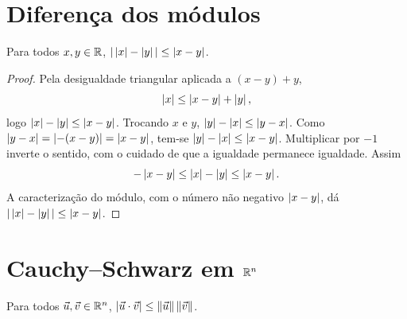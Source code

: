 \documentclass[11pt,a4paper]{article}
\begin{document}
\section{Diferença dos módulos}

\begin{corolario}
Para todos $x,y\in\R$, $\abs{\,\abs{x}-\abs{y}\,}\le\abs{x-y}$.
\end{corolario}

\begin{proof}
Pela desigualdade triangular aplicada a $(x-y)+y$,
\[
\abs{x}\le\abs{x-y}+\abs{y},
\]
logo $\abs{x}-\abs{y}\le\abs{x-y}$. Trocando $x$ e $y$, $\abs{y}-\abs{x}\le\abs{y-x}$. Como $\abs{y-x}=\abs{-(x-y)}=\abs{x-y}$, tem-se $\abs{y}-\abs{x}\le\abs{x-y}$. Multiplicar por $-1$ inverte o sentido, com o cuidado de que a igualdade permanece igualdade. Assim
\[
-\abs{x-y}\le\abs{x}-\abs{y}\le\abs{x-y}.
\]
A caracterização do módulo, com o número não negativo $\abs{x-y}$, dá $\abs{\,\abs{x}-\abs{y}\,}\le\abs{x-y}$.
\end{proof}

\section{Cauchy--Schwarz em \texorpdfstring{$\R^n$}{Rn}}

\begin{teorema}
Para todos $\vet{u},\vet{v}\in\R^n$, $\abs{\vet{u}\cdot\vet{v}}\le\norm{\vet{u}}\norm{\vet{v}}$.
\end{teorema}
\end{document}
